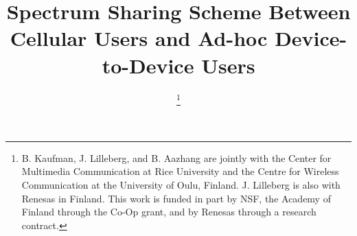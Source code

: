 \documentclass[10pt, final, journal, letterpaper,oneside, twocolumn]{IEEEtran}
\begin{document}
\title{Spectrum Sharing Scheme Between Cellular Users and Ad-hoc Device-to-Device Users}




\author{


\thanks{B. Kaufman, J. Lilleberg, and B. Aazhang are jointly with the Center for Multimedia Communication at Rice University and the Centre for Wireless Communication at the University of Oulu, Finland.  J. Lilleberg is also with Renesas in Finland.  This work is funded in part by NSF, the Academy of Finland through the Co-Op grant, and by Renesas through a research contract.}}





















\maketitle
\end{document}
